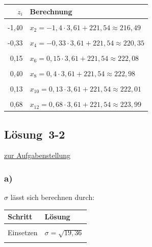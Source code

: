 \documentclass[
  11pt,
  ngerman,
  a4paper,
]{report}
\begin{document}
\begin{table}[H]
\centering
\begin{tabular}{rl}
\toprule
\textbf{$z_i$} & \textbf{Berechnung}\\
\midrule
\cellcolor{gray!6}{0,90} & \cellcolor{gray!6}{$x_{1} = 0{,}9 \cdot 3{,}61 + 221{,}54\approx224{,}79$}\\
-1,40 & $x_{2} = -1{,}4 \cdot 3{,}61 + 221{,}54\approx216{,}49$\\
\cellcolor{gray!6}{1,12} & \cellcolor{gray!6}{$x_{3} = 1{,}12 \cdot 3{,}61 + 221{,}54\approx225{,}58$}\\
-0,33 & $x_{4} = -0{,}33 \cdot 3{,}61 + 221{,}54\approx220{,}35$\\
\cellcolor{gray!6}{2,22} & \cellcolor{gray!6}{$x_{5} = 2{,}22 \cdot 3{,}61 + 221{,}54\approx229{,}55$}\\
0,15 & $x_{6} = 0{,}15 \cdot 3{,}61 + 221{,}54\approx222{,}08$\\
\cellcolor{gray!6}{2,87} & \cellcolor{gray!6}{$x_{7} = 2{,}87 \cdot 3{,}61 + 221{,}54\approx231{,}9$}\\
0,40 & $x_{8} = 0{,}4 \cdot 3{,}61 + 221{,}54\approx222{,}98$\\
\cellcolor{gray!6}{-1,54} & \cellcolor{gray!6}{$x_{9} = -1{,}54 \cdot 3{,}61 + 221{,}54\approx215{,}98$}\\
0,13 & $x_{10} = 0{,}13 \cdot 3{,}61 + 221{,}54\approx222{,}01$\\
\cellcolor{gray!6}{-0,17} & \cellcolor{gray!6}{$x_{11} = -0{,}17 \cdot 3{,}61 + 221{,}54\approx220{,}93$}\\
0,68 & $x_{12} = 0{,}68 \cdot 3{,}61 + 221{,}54\approx223{,}99$\\
\bottomrule
\end{tabular}
\end{table}

\hypertarget{loesung-3-2}{%
\subsection{Lösung~3-2}\label{loesung-3-2}}

\protect\hyperlink{aufgabe-3-2}{zur Aufgabenstellung}

\hypertarget{a-9}{%
\subsubsection{a)}\label{a-9}}

\(\sigma\) lässt sich berechnen durch:

\begin{table}[H]
\centering
\begin{tabular}{l>{\raggedright\arraybackslash}p{8cm}}
\toprule
\textbf{Schritt} & \textbf{Lösung}\\
\midrule
\cellcolor{gray!6}{Formel} & \cellcolor{gray!6}{$\sigma=\sqrt{\sigma^2}$}\\
Einsetzen & $\sigma=\sqrt{19{,}36}$\\
\cellcolor{gray!6}{Lösung} & \cellcolor{gray!6}{$\sigma\approx4{,}4$}\\
\bottomrule
\end{tabular}
\end{table}
\end{document}
